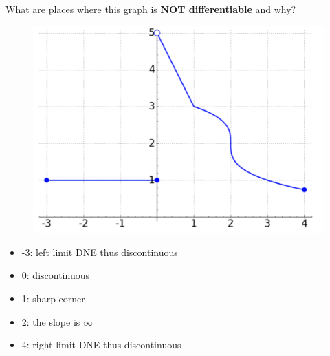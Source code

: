 \documentclass[t]{beamer}
\theoremstyle{plain}
\theoremstyle{definition}
\begin{document}
\begin{frame}

What are places where this graph is \textbf{NOT differentiable} and why?

	\begin{figure}[l]
	\includegraphics[scale=.25]{fig/differentiable0}
	\label{fig}
	\end{figure}	

\begin{itemize}
	\item -3: left limit DNE thus discontinuous
	\item 0: discontinuous
	\item 1: sharp corner
	\item 2: the slope is $\infty$
	\item 4: right limit DNE thus discontinuous
\end{itemize}

\end{frame}
\end{document}
